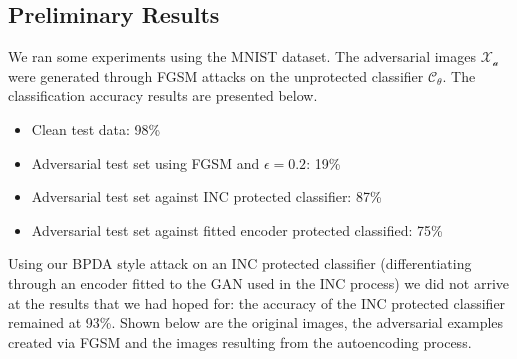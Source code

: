 \documentclass[twoside]{article}
\theoremstyle{definition}
\begin{document}
\subsection{Preliminary Results}
We ran some experiments using the MNIST dataset. The adversarial images $\mathcal{X_a}$ were generated
through FGSM attacks on the unprotected classifier $\mathcal{C}_{\theta}$. The classification accuracy results
are presented below.

\begin{itemize}
    \item Clean test data: 98\%
    \item Adversarial test set using FGSM and $\epsilon = 0.2$: 19\%
    \item Adversarial test set against INC protected classifier: 87\%
    \item Adversarial test set against fitted encoder protected classified: 75\%
\end{itemize}

Using our BPDA style attack on an INC protected classifier (differentiating through an encoder fitted to the GAN used in the INC process) we did not arrive at the results that we had hoped for: the accuracy of the INC protected classifier remained at 93\%. Shown below are the original images, the adversarial examples created via FGSM and the images resulting from the autoencoding process.
\end{document}
